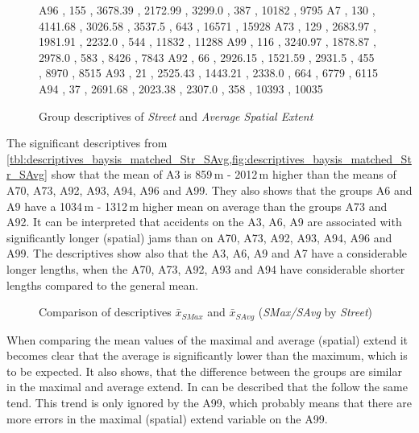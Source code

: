 \begin{figure}[ht!]
\begin{minipage}{0.55\textwidth}
{			A96 , 155 , 3678.39 , 2172.99 , 3299.0 , 387  , 10182 , 9795 
			A7  , 130 , 4141.68 , 3026.58 , 3537.5 , 643  , 16571 , 15928
			A73 , 129 , 2683.97 , 1981.91 , 2232.0 , 544  , 11832 , 11288
			A99 , 116 , 3240.97 , 1878.87 , 2978.0 , 583  , 8426  , 7843 
			A92 , 66  , 2926.15 , 1521.59 , 2931.5 , 455  , 8970  , 8515 
			A93 , 21  , 2525.43 , 1443.21 , 2338.0 , 664  , 6779  , 6115 
			A94 , 37  , 2691.68 , 2023.38 , 2307.0 , 358  , 10393 , 10035
		}\data
		\pgfplotstablesort[sort key=mean, sort cmp=float >]{\datasorted}{\data}
        \tiny
        \centering
		\label{fig:descriptives_baysis_matched_Str_SAvg}
	\end{minipage}%
	\caption{Group descriptives of \textit{Street} and \textit{Average Spatial Extent}}
\end{figure}
The significant descriptives from \cref{tbl:descriptives_baysis_matched_Str_SAvg,fig:descriptives_baysis_matched_Str_SAvg} show that the mean of A3 is 859\,m - 2012\,m higher than the means of A70, A73, A92, A93, A94, A96 and A99. They also shows that the groups A6 and A9 have a 1034\,m - 1312\,m higher mean on average than the groups A73 and A92. It can be interpreted that accidents on the A3, A6, A9 are associated with significantly longer (spatial) jams than on A70, A73, A92, A93, A94, A96 and A99. The descriptives show also that the A3, A6, A9 and A7 have a considerable longer lengths, when the A70, A73, A92, A93 and A94 have considerable shorter lengths compared to the general mean.
\begin{figure}[ht!]
	\data
    \pgfplotstablesort[sort key=meanSAvg, sort cmp=float >]{\datasorted}{\data}
    \tiny
    \centering
	\caption{Comparison of descriptives $\bar{x}_{SMax}$ and $\bar{x}_{SAvg}$ (\textit{SMax/SAvg} by \textit{Street})}
	\label{fig:baysis_matched_meancomparison_Str_spatial}
\end{figure}
When comparing the mean values of the maximal and average (spatial) extend it becomes clear that the average is significantly lower than the maximum, which is to be expected. It also shows, that the difference between the groups are similar in the maximal and average extend. In can be described that the follow the same tend. This trend is only ignored by the A99, which probably means that there are more errors in the maximal (spatial) extend variable on the A99.

